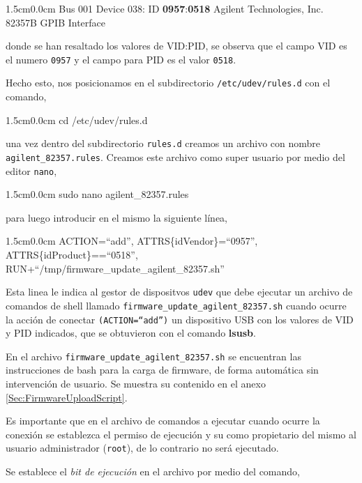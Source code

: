 \documentclass[paper=letter,oneside,fontsize=11pt, parskip=full]{scrartcl}
\newenvironment{code}
	{\begin{adjustwidth}{1.5cm}{0.0cm}\ttfamily}
	{\end{adjustwidth}}
\begin{document}
	\begin{code}
		Bus 001 Device 038: ID \textbf{0957}:\textbf{0518}
		Agilent Technologies, Inc. \\ 
		82357B GPIB Interface
	\end{code}

	donde se han resaltado los valores de VID:PID, se observa que el campo VID es el numero \texttt{0957} y el campo para PID es el valor \texttt{0518}.
	
	Hecho esto, nos posicionamos en el subdirectorio \texttt{/etc/udev/rules.d} con el comando,
	
	\begin{code}
		cd /etc/udev/rules.d
	\end{code}

	una vez dentro del subdirectorio \texttt{rules.d} creamos un archivo con nombre \texttt{agilent\_82357.rules}. Creamos este archivo como super usuario por medio del editor \texttt{nano},
	
	\begin{code}
		sudo nano agilent\_82357.rules
	\end{code}
	
	para luego introducir en el mismo la siguiente línea, 
	
	\begin{code}
		ACTION=``add'', ATTRS\{idVendor\}=``0957'', ATTRS\{idProduct\}==``0518'', \\ RUN+``/tmp/firmware\_update\_agilent\_82357.sh''		
	\end{code}

	Esta linea le indica al gestor de dispositvos \texttt{udev} que debe ejecutar un archivo de comandos de shell llamado  \texttt{firmware\_update\_agilent\_82357.sh} cuando ocurre la acción de conectar \texttt{(ACTION=``add'')} un dispositivo USB con los valores de VID y PID indicados, que se obtuvieron con el comando \textbf{lsusb}. 	
	
	En el archivo \texttt{firmware\_update\_agilent\_82357.sh} se encuentran las instrucciones de bash para la carga de firmware, de forma automática sin intervención de usuario. Se muestra su contenido en el anexo \ref{Sec:FirmwareUploadScript}.
	
	Es importante que en el archivo de comandos a ejecutar cuando ocurre la conexión se establezca el permiso de ejecución y su como propietario del mismo al usuario administrador (\texttt{root}), de lo contrario no será ejecutado. 
	
	Se establece el \emph{bit de ejecución} en el archivo por medio del comando, 
	
\end{document}
